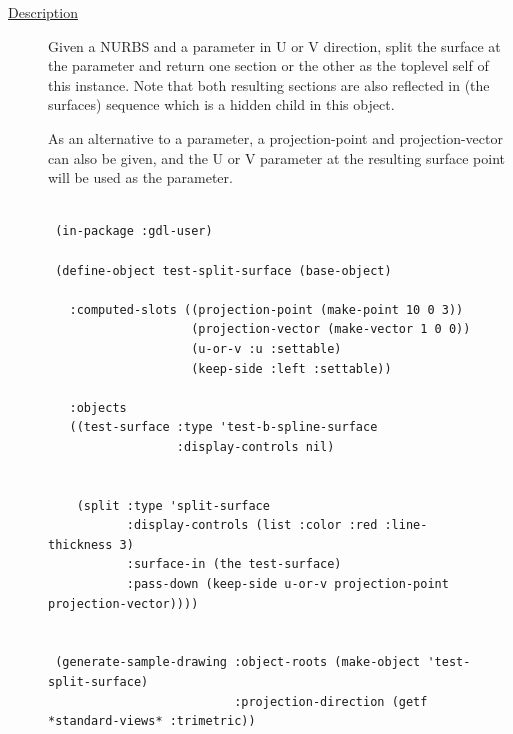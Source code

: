 \documentclass [11pt]{book}
\begin{document}
\begin{itemize}
\begin{description}

\item [
\underline{Description}]


Given a NURBS and a parameter in U or V direction,
split the surface at the parameter and return one section or the other as the 
toplevel self of this instance. Note that both resulting sections are also 
reflected in (the surfaces) sequence which is a hidden child in this object.

As an alternative to a parameter, a projection-point and projection-vector 
can also be given, and the U or V parameter at the resulting surface point
will be used as the parameter.





\end{description}




\begin{figure}
\begin{lrbox}{\boxedverb}
\begin{minipage}{\linewidth}
{\small

\begin{verbatim}

 (in-package :gdl-user)

 (define-object test-split-surface (base-object)
  
   :computed-slots ((projection-point (make-point 10 0 3))
                    (projection-vector (make-vector 1 0 0))
                    (u-or-v :u :settable)
                    (keep-side :left :settable))
  
   :objects
   ((test-surface :type 'test-b-spline-surface
                  :display-controls nil)

   
    (split :type 'split-surface
           :display-controls (list :color :red :line-thickness 3)
           :surface-in (the test-surface)
           :pass-down (keep-side u-or-v projection-point projection-vector))))


 (generate-sample-drawing :object-roots (make-object 'test-split-surface)
                          :projection-direction (getf *standard-views* :trimetric))



\end{verbatim}}
\end{minipage}
\end{lrbox}
\fbox{\usebox{\boxedverb}}


\end{figure}
\end{itemize}
\end{document}
